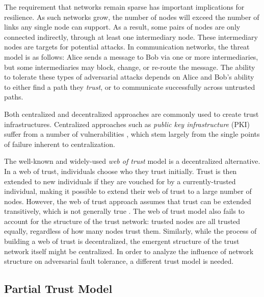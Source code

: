 \documentclass{sig-alternate-05-2015}
\begin{document}
The requirement that networks remain sparse has important implications for
resilience.
As such networks grow, the number of nodes will exceed the number of links
any single node can support.
As a result, some pairs of nodes are only connected indirectly,
through at least one intermediary node.
These intermediary nodes are targets for potential attacks.
In communication networks, 
the threat model is as follows: Alice sends a message to
Bob via one or more intermediaries,
but some intermediaries may block, change, or re-route the message.
The ability to tolerate these types of adversarial attacks depends on
Alice and Bob's ability to either find a path they {\em trust},
or to communicate successfully across untrusted paths.

Both centralized and decentralized approaches are commonly used to create
trust infrastructures.
Centralized approaches such as {\em public key infrastructure} (PKI)
suffer from a number of vulnerabilities
\cite{ellison_ten_2000},
which stem largely from the single points of failure inherent to
centralization.

The well-known and widely-used {\em web of trust} model
\cite{zimmermann_official_1995,ferguson_practical_2003}
is a decentralized alternative.
In a web of trust,
individuals choose who they trust initially.
Trust is then extended to new individuals if they are vouched for by a
currently-trusted individual,
making it possible to extend their web of trust to a large
number of nodes.
However, the web of trust approach assumes that trust can be extended
transitively,
which is not generally true
\cite{christianson_why_1997}.
The web of trust model also fails to account for the structure
of the trust network:
trusted nodes are all trusted equally,
regardless of how many nodes trust them.
Similarly, while the process of building a web of trust is decentralized,
the emergent structure of the trust network itself might be centralized.
In order to analyze the influence of network structure on adversarial
fault tolerance,
a different trust model is needed.

\subsection{Partial Trust Model}
\end{document}
